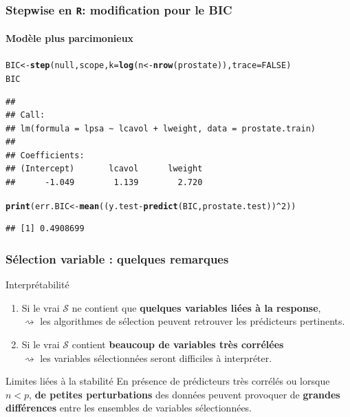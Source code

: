 \documentclass{beamer}\usepackage[]{graphicx}\usepackage[]{color}
\makeatletter
\newcommand{\hlnum}[1]{\textcolor[rgb]{0.686,0.059,0.569}{#1}}%
\newcommand{\hlopt}[1]{\textcolor[rgb]{0,0,0}{#1}}%
\newcommand{\hlstd}[1]{\textcolor[rgb]{0.345,0.345,0.345}{#1}}%
\newcommand{\hlkwb}[1]{\textcolor[rgb]{0.69,0.353,0.396}{#1}}%
\newcommand{\hlkwc}[1]{\textcolor[rgb]{0.333,0.667,0.333}{#1}}%
\newcommand{\hlkwd}[1]{\textcolor[rgb]{0.737,0.353,0.396}{\textbf{#1}}}%
\newenvironment{kframe}{%
 \def\at@end@of@kframe{}%
 \ifinner\ifhmode%
  \def\at@end@of@kframe{\end{minipage}}%
  \begin{minipage}{\columnwidth}%
 \fi\fi%
 \def\FrameCommand##1{\hskip\@totalleftmargin \hskip-\fboxsep
 \colorbox{shadecolor}{##1}\hskip-\fboxsep
     \hskip-\linewidth \hskip-\@totalleftmargin \hskip\columnwidth}%
 \MakeFramed {\advance\hsize-\width
   \@totalleftmargin\z@ \linewidth\hsize
   \@setminipage}}%
 {\par\unskip\endMakeFramed%
 \at@end@of@kframe}
\newenvironment{knitrout}{}{} %
\makeatother
\begin{document}
\begin{frame}[containsverbatim]
  \frametitle{Stepwise en  \texttt{R}: modification pour le BIC}
  \framesubtitle{Modèle plus parcimonieux}
  
\begin{knitrout}\scriptsize
{}\color{fgcolor}\begin{kframe}
\begin{alltt}
\hlstd{BIC} \hlkwb{<-} \hlkwd{step}\hlstd{(null, scope,} \hlkwc{k}\hlstd{=}\hlkwd{log}\hlstd{(n} \hlkwb{<-} \hlkwd{nrow}\hlstd{(prostate)),} \hlkwc{trace}\hlstd{=}\hlnum{FALSE}\hlstd{)}
\hlstd{BIC}
\end{alltt}
\begin{verbatim}
## 
## Call:
## lm(formula = lpsa ~ lcavol + lweight, data = prostate.train)
## 
## Coefficients:
## (Intercept)       lcavol      lweight  
##      -1.049        1.139        2.720
\end{verbatim}
\begin{alltt}
\hlkwd{print}\hlstd{(err.BIC}  \hlkwb{<-} \hlkwd{mean}\hlstd{((y.test}\hlopt{-}\hlkwd{predict}\hlstd{(BIC ,prostate.test))}\hlopt{^}\hlnum{2}\hlstd{))}
\end{alltt}
\begin{verbatim}
## [1] 0.4908699
\end{verbatim}
\end{kframe}
\end{knitrout}
\end{frame}


\begin{frame}
  \frametitle{Sélection variable : quelques remarques}

  \begin{block}{Interprétabilité}
    \begin{enumerate}
    \item Si  le vrai $\mathcal{S}$ ne contient que \alert{\bf quelques
      variables liées à la  response},\\
      $\rightsquigarrow$ les algorithmes de  sélection  peuvent  retrouver  les  prédicteurs pertinents.
    \item  Si  le vrai   $\mathcal{S}$  contient \alert{\bf beaucoup  de
      variables  très corrélées}\\
      $\rightsquigarrow$  les  variables sélectionnées  seront difficiles à interpréter.
    \end{enumerate}
  \end{block}

  \vfill

  \begin{block}{Limites liées à la stabilité}
    En présence de prédicteurs très corrélés ou lorsque $n < p$, \alert{\bf de  petites perturbations} des
   données  peuvent  provoquer  de \alert{\bf grandes  différences}  entre  les
    ensembles de variables sélectionnées.
   \end{block}
  
\end{frame}
\end{document}
